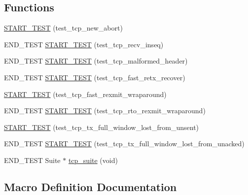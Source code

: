 \subsection*{Functions}
\begin{DoxyCompactItemize}
\item 
\hyperlink{openmote-cc2538_2lwip_2test_2unit_2tcp_2test__tcp_8c_aaccb6ac4b83bfb8a2d62faa857f68811}{S\+T\+A\+R\+T\+\_\+\+T\+E\+ST} (test\+\_\+tcp\+\_\+new\+\_\+abort)
\item 
E\+N\+D\+\_\+\+T\+E\+ST \hyperlink{openmote-cc2538_2lwip_2test_2unit_2tcp_2test__tcp_8c_a473c18820b30ed72ac3ffd91ecab2e8f}{S\+T\+A\+R\+T\+\_\+\+T\+E\+ST} (test\+\_\+tcp\+\_\+recv\+\_\+inseq)
\item 
E\+N\+D\+\_\+\+T\+E\+ST \hyperlink{openmote-cc2538_2lwip_2test_2unit_2tcp_2test__tcp_8c_a22b7d73dfb2feb77f981da6749639ce6}{S\+T\+A\+R\+T\+\_\+\+T\+E\+ST} (test\+\_\+tcp\+\_\+malformed\+\_\+header)
\item 
E\+N\+D\+\_\+\+T\+E\+ST \hyperlink{openmote-cc2538_2lwip_2test_2unit_2tcp_2test__tcp_8c_a1d7ed7e7a4d8e4063e482d6bacd3f72b}{S\+T\+A\+R\+T\+\_\+\+T\+E\+ST} (test\+\_\+tcp\+\_\+fast\+\_\+retx\+\_\+recover)
\item 
\hyperlink{openmote-cc2538_2lwip_2test_2unit_2tcp_2test__tcp_8c_afb4165ff2b1a2cd57a1953b297b69fce}{S\+T\+A\+R\+T\+\_\+\+T\+E\+ST} (test\+\_\+tcp\+\_\+fast\+\_\+rexmit\+\_\+wraparound)
\item 
E\+N\+D\+\_\+\+T\+E\+ST \hyperlink{openmote-cc2538_2lwip_2test_2unit_2tcp_2test__tcp_8c_adad15eb9e214d44e9beb95411757eb38}{S\+T\+A\+R\+T\+\_\+\+T\+E\+ST} (test\+\_\+tcp\+\_\+rto\+\_\+rexmit\+\_\+wraparound)
\item 
\hyperlink{openmote-cc2538_2lwip_2test_2unit_2tcp_2test__tcp_8c_ad132fe5a1a52fe5f22e55fc28a616035}{S\+T\+A\+R\+T\+\_\+\+T\+E\+ST} (test\+\_\+tcp\+\_\+tx\+\_\+full\+\_\+window\+\_\+lost\+\_\+from\+\_\+unsent)
\item 
E\+N\+D\+\_\+\+T\+E\+ST \hyperlink{openmote-cc2538_2lwip_2test_2unit_2tcp_2test__tcp_8c_a58904929d194e111eab671fb7472b480}{S\+T\+A\+R\+T\+\_\+\+T\+E\+ST} (test\+\_\+tcp\+\_\+tx\+\_\+full\+\_\+window\+\_\+lost\+\_\+from\+\_\+unacked)
\item 
E\+N\+D\+\_\+\+T\+E\+ST Suite $\ast$ \hyperlink{openmote-cc2538_2lwip_2test_2unit_2tcp_2test__tcp_8c_ab679db758522f8fafb4808dc4aae2e8d}{tcp\+\_\+suite} (void)
\end{DoxyCompactItemize}


\subsection{Macro Definition Documentation}
\mbox{\label{openmote-cc2538_2lwip_2test_2unit_2tcp_2test__tcp_8c_a98592be2a323e1f460af8a99a09642a9}} 
